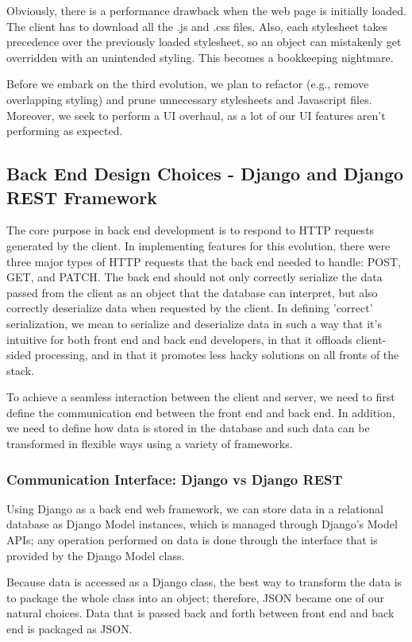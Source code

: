 \documentclass[a4paper]{article}
\begin{document}
Obviously, there is a performance drawback when the web page is initially loaded. The client has to download all the .js and .css files. Also, each stylesheet takes precedence over the previously loaded stylesheet, so an object can mistakenly get overridden with an unintended styling. This becomes a bookkeeping nightmare.

Before we embark on the third evolution, we plan to refactor (e.g., remove overlapping styling) and prune unnecessary stylesheets and Javascript files. Moreover, we seek to perform a UI overhaul, as a lot of our UI features aren't performing as expected.

\subsection{Back End Design Choices - Django and Django REST Framework}

The core purpose in back end development is to respond to HTTP requests generated by the client. In implementing features for this evolution, there were three major types of HTTP requests that the back end needed to handle: POST, GET, and PATCH. The back end should not only correctly serialize the data passed from the client as an object that the database can interpret, but also correctly deserialize data when requested by the client. In defining 'correct' serialization, we mean to serialize and deserialize data in such a way that it's intuitive for both front end and back end developers, in that it offloads client-sided processing, and in that it promotes less hacky solutions on all fronts of the stack.

To achieve a seamless interaction between the client and server, we need to first define the communication end between the front end and back end. In addition, we need to define how data is stored in the database and such data can be transformed in flexible ways using a variety of frameworks.

\subsubsection{Communication Interface: Django vs Django REST}

Using Django as a back end web framework, we can store data in a relational database as Django Model instances, which is managed through Django's Model APIs; any operation performed on data is done through the interface that is provided by the Django Model class. 
 
Because data is accessed as a Django class, the best way to transform the data is to package the whole class into an object; therefore, JSON became one of our natural choices. Data that is passed back and forth between front end and back end is packaged as JSON. 
\end{document}
